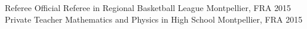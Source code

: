 \begin{cvhonors}
  \cvhonor
    {Referee}
    {Official Referee in Regional Basketball League}
    {Montpellier, FRA}
    {2015}
  \cvhonor
    {Private Teacher}
    {Mathematics and Physics in High School}
    {Montpellier, FRA}
    {2015}
\end{cvhonors}
